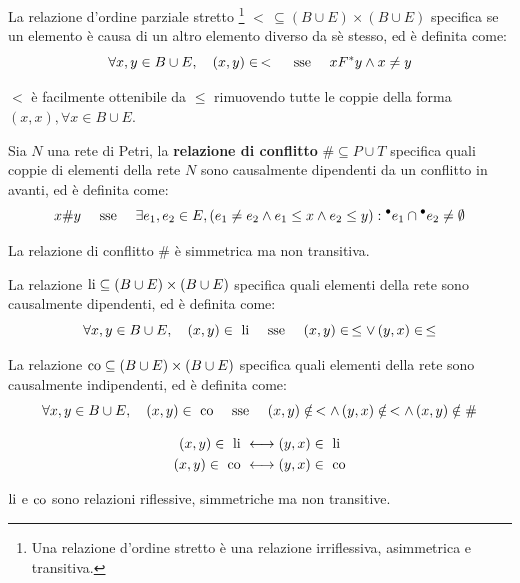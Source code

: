 \begin{defn}
    La relazione d'ordine parziale stretto \footnote{Una relazione d'ordine
    stretto è una relazione irriflessiva, asimmetrica e transitiva.}
    $< \, \subseteq (B \cup E) \times (B \cup E)$ specifica se un elemento
    è causa di un altro elemento diverso da sè stesso, ed è definita come:
    \[
        \forall x, y \in B \cup E, \quad (x, y) \in \, < \quad \textnormal{ sse } \quad
        x F^*y \land x \neq y
    \]
\end{defn}

\begin{rem}
    $<$ è facilmente ottenibile da $\le$ rimuovendo tutte le coppie della forma
    $(x,x), \forall x \in B \cup E$.
\end{rem}

\begin{defn}
    Sia $N$ una rete di Petri, la \textbf{relazione di conflitto}
    $\# \subseteq P \cup T$ specifica quali coppie di elementi della rete $N$
    sono causalmente dipendenti da un conflitto in avanti, ed è definita come:
    \[
        x \# y \quad \textnormal{ sse } \quad \exists e_1, e_2 \in E,
        (e_1 \neq e_2 \land e_1 \le x \land e_2 \le y) :
        {^\bullet}e_1 \cap {^\bullet}e_2 \neq \emptyset
    \]
\end{defn}

\begin{rem}
    La relazione di conflitto $\#$ è simmetrica ma non transitiva.
\end{rem}

\begin{defn}
    La relazione $\textnormal{li} \subseteq (B \cup E) \times (B \cup E)$ specifica
    quali elementi della rete sono causalmente dipendenti, ed è definita come:
    \[
        \forall x, y \in B \cup E, \quad (x, y) \in \textnormal{ li} \quad
        \textnormal{ sse } \quad (x,y) \in \, \le \lor \, (y,x) \in \, \le
    \]
\end{defn}

\begin{defn}
    La relazione $\textnormal{co} \subseteq (B \cup E) \times (B \cup E)$ specifica
    quali elementi della rete sono causalmente indipendenti, ed è definita come:
    \[
        \forall x, y \in B \cup E, \quad (x, y) \in \textnormal{ co} \quad \textnormal{ sse } \quad
        (x,y) \notin \, < \land \, (y,x) \notin \, < \land \, (x,y) \notin \#
    \]
\end{defn}

\begin{rem}
    \begin{align*}
        (x,y) \in \textnormal{ li } &\longleftrightarrow (y,x) \in \textnormal{ li}\\
        (x,y) \in \textnormal{ co } &\longleftrightarrow (y,x) \in \textnormal{ co}
    \end{align*}
\end{rem}
\begin{rem}
    $\textnormal{li}$ e $\textnormal{co}$ sono relazioni riflessive, simmetriche ma non
    transitive.
\end{rem}

